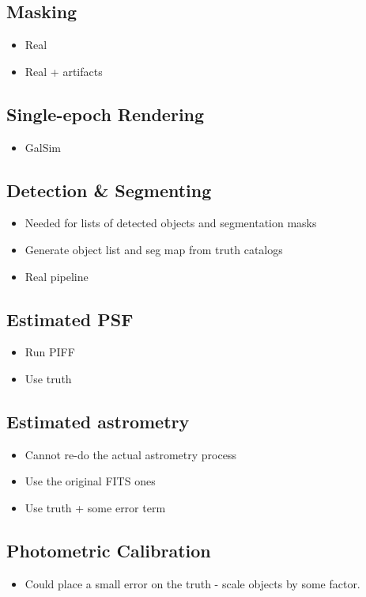 \documentclass[\docopts]{\docclass}
\begin{document}
\subsection{Masking}

\begin{itemize}
\item Real
\item Real + artifacts
\end{itemize}

\subsection{Single-epoch Rendering}

\begin{itemize}
\item GalSim
\end{itemize}

\subsection{Detection \& Segmenting}
\begin{itemize}
\item Needed for lists of detected objects and segmentation masks
\item Generate object list and seg map from truth catalogs
\item Real pipeline
\end{itemize}

\subsection{Estimated PSF}
\begin{itemize}
\item Run PIFF
\item Use truth
\end{itemize}

\subsection{Estimated astrometry}
\begin{itemize}
\item Cannot re-do the actual astrometry process
\item Use the original FITS ones
\item Use truth + some error term
\end{itemize}

\subsection{Photometric Calibration}
\begin{itemize}
\item Could place a small error on the truth - scale objects by some factor.
\end{itemize}
\end{document}
